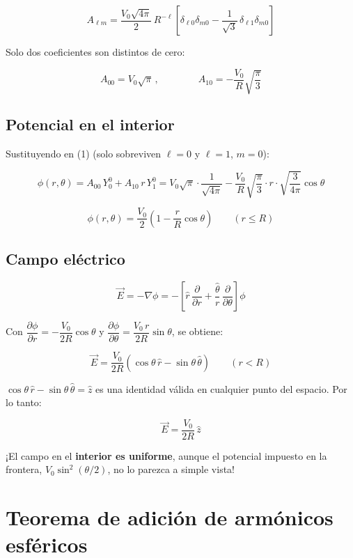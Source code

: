 \documentclass[a4paper]{article}
\begin{document}
\[
\boxed{A_{\ell m}=\frac{V_0\sqrt{4\pi}}{2}\,R^{-\ell}\left[\delta_{\ell0}\delta_{m0}-\frac{1}{\sqrt3}\,\delta_{\ell1}\delta_{m0}\right]}\tag{2}
\]


Solo dos coeficientes son distintos de cero:

\[
A_{00}=V_0\sqrt{\pi}\,,\qquad\qquad A_{10}=-\frac{V_0}{R}\sqrt{\frac{\pi}{3}}
\]


\subsection{Potencial en el interior}


Sustituyendo en (1) (solo sobreviven $\ell=0$ y $\ell=1$, $m=0$):

\[
\phi(r,\theta)=A_{00}\,Y_0^0+A_{10}\,r\,Y_1^0=V_0\sqrt{\pi}\cdot\frac{1}{\sqrt{4\pi}}-\frac{V_0}{R}\sqrt{\frac{\pi}{3}}\cdot r\cdot\sqrt{\frac{3}{4\pi}}\cos\theta
\]


\[
\boxed{\phi(r,\theta)=\frac{V_0}{2}\left(1-\frac{r}{R}\cos\theta\right)}\qquad (r\le R)\tag{3}
\]


\subsection{Campo eléctrico}


\[
\vec E=-\nabla\phi=-\left[\hat r\,\frac{\partial}{\partial r}+\frac{\hat\theta}{r}\,\frac{\partial}{\partial\theta}\right]\phi
\]


Con $\dfrac{\partial\phi}{\partial r}=-\dfrac{V_0}{2R}\cos\theta$ y $\dfrac{\partial\phi}{\partial\theta}=\dfrac{V_0\,r}{2R}\sin\theta$, se obtiene:

\[
\boxed{\vec E=\frac{V_0}{2R}\left(\cos\theta\,\hat r-\sin\theta\,\hat\theta\right)}\qquad (r<R)\tag{4}
\]


\begin{tcolorbox}[colback=blue!3, colframe=blue!35!black, title={Nota}, fonttitle=\bfseries]
$\cos\theta\,\hat r-\sin\theta\,\hat\theta=\hat z$ es una identidad válida en cualquier punto del espacio. Por lo tanto:

\[
\vec E=\frac{V_0}{2R}\,\hat z
\]

¡El campo en el \textbf{interior es uniforme}, aunque el potencial impuesto en la frontera, $V_0\sin^2(\theta/2)$, no lo parezca a simple vista!

\end{tcolorbox}


\medskip


\section{Teorema de adición de armónicos esféricos}
\end{document}
